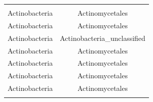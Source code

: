\documentclass[]{article}
\begin{document}
\begin{longtable}[]{@{}cc@{}}
\begin{minipage}[t]{0.38\columnwidth}
\end{minipage}\tabularnewline
\begin{minipage}[t]{0.38\columnwidth}\centering\strut
Actinobacteria\strut
\end{minipage} & \begin{minipage}[t]{0.38\columnwidth}\centering\strut
Actinomycetales\strut
\end{minipage}\tabularnewline
\begin{minipage}[t]{0.38\columnwidth}\centering\strut
Actinobacteria\strut
\end{minipage} & \begin{minipage}[t]{0.38\columnwidth}\centering\strut
Actinomycetales\strut
\end{minipage}\tabularnewline
\begin{minipage}[t]{0.38\columnwidth}\centering\strut
Actinobacteria\strut
\end{minipage} & \begin{minipage}[t]{0.38\columnwidth}\centering\strut
Actinobacteria\_unclassified\strut
\end{minipage}\tabularnewline
\begin{minipage}[t]{0.38\columnwidth}\centering\strut
Actinobacteria\strut
\end{minipage} & \begin{minipage}[t]{0.38\columnwidth}\centering\strut
Actinomycetales\strut
\end{minipage}\tabularnewline
\begin{minipage}[t]{0.38\columnwidth}\centering\strut
Actinobacteria\strut
\end{minipage} & \begin{minipage}[t]{0.38\columnwidth}\centering\strut
Actinomycetales\strut
\end{minipage}\tabularnewline
\begin{minipage}[t]{0.38\columnwidth}\centering\strut
Actinobacteria\strut
\end{minipage} & \begin{minipage}[t]{0.38\columnwidth}\centering\strut
Actinomycetales\strut
\end{minipage}\tabularnewline
\begin{minipage}[t]{0.38\columnwidth}\centering\strut
Actinobacteria\strut
\end{minipage} & \begin{minipage}[t]{0.38\columnwidth}\centering\strut
Actinomycetales\strut
\end{minipage}\tabularnewline
\begin{minipage}[t]{0.38\columnwidth}\centering\strut

\end{minipage}
\end{longtable}
\end{document}
